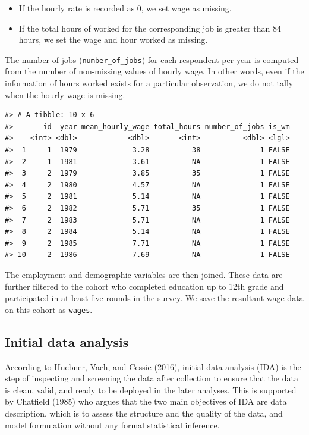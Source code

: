\documentclass{article}
\providecommand{\tightlist}{%
  \setlength{\itemsep}{0pt}\setlength{\parskip}{0pt}}
\begin{document}
\begin{itemize}
\tightlist
\item
  If the hourly rate is recorded as 0, we set wage as missing.
\item
  If the total hours of worked for the corresponding job is greater than 84 hours, we set the wage and hour worked as missing.
\end{itemize}

The number of jobs (\texttt{number\_of\_jobs}) for each respondent per year is computed from the number of non-missing values of hourly wage. In other words, even if the information of hours worked exists for a particular observation, we do not tally when the hourly wage is missing.

\begin{verbatim}
#> # A tibble: 10 x 6
#>       id  year mean_hourly_wage total_hours number_of_jobs is_wm
#>    <int> <dbl>            <dbl>       <int>          <dbl> <lgl>
#>  1     1  1979             3.28          38              1 FALSE
#>  2     1  1981             3.61          NA              1 FALSE
#>  3     2  1979             3.85          35              1 FALSE
#>  4     2  1980             4.57          NA              1 FALSE
#>  5     2  1981             5.14          NA              1 FALSE
#>  6     2  1982             5.71          35              1 FALSE
#>  7     2  1983             5.71          NA              1 FALSE
#>  8     2  1984             5.14          NA              1 FALSE
#>  9     2  1985             7.71          NA              1 FALSE
#> 10     2  1986             7.69          NA              1 FALSE
\end{verbatim}

The employment and demographic variables are then joined. These data are further filtered to the cohort who completed education up to 12th grade and participated in at least five rounds in the survey. We save the resultant wage data on this cohort as \texttt{wages}.

\hypertarget{ida}{%
\subsection{Initial data analysis}\label{ida}}

According to Huebner, Vach, and Cessie (2016), initial data analysis (IDA) is the step of inspecting and screening the data after collection to ensure that the data is clean, valid, and ready to be deployed in the later analyses. This is supported by Chatfield (1985) who argues that the two main objectives of IDA are data description, which is to assess the structure and the quality of the data, and model formulation without any formal statistical inference.
\end{document}
